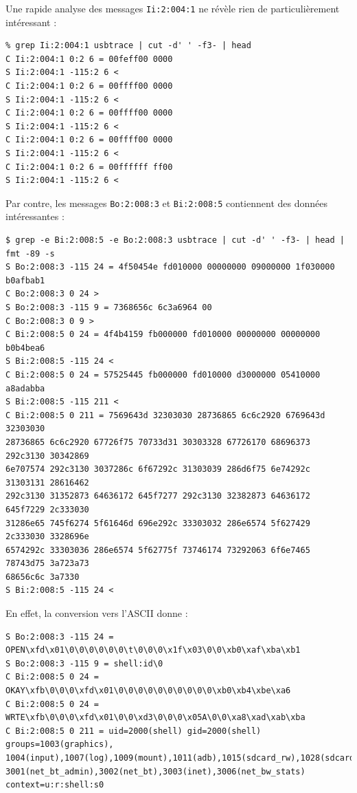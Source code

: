 \documentclass[a4paper,10pt]{article}
\begin{document}
Une rapide analyse des messages \texttt{Ii:2:004:1} ne révèle rien de particulièrement intéressant :
\begin{verbatim}
% grep Ii:2:004:1 usbtrace | cut -d' ' -f3- | head
C Ii:2:004:1 0:2 6 = 00feff00 0000
S Ii:2:004:1 -115:2 6 <
C Ii:2:004:1 0:2 6 = 00ffff00 0000
S Ii:2:004:1 -115:2 6 <
C Ii:2:004:1 0:2 6 = 00ffff00 0000
S Ii:2:004:1 -115:2 6 <
C Ii:2:004:1 0:2 6 = 00ffff00 0000
S Ii:2:004:1 -115:2 6 <
C Ii:2:004:1 0:2 6 = 00ffffff ff00
S Ii:2:004:1 -115:2 6 <
\end{verbatim}

Par contre, les messages \texttt{Bo:2:008:3} et \texttt{Bi:2:008:5} contiennent des données intéressantes :
\begin{verbatim}
$ grep -e Bi:2:008:5 -e Bo:2:008:3 usbtrace | cut -d' ' -f3- | head | fmt -89 -s
S Bo:2:008:3 -115 24 = 4f50454e fd010000 00000000 09000000 1f030000 b0afbab1
C Bo:2:008:3 0 24 >
S Bo:2:008:3 -115 9 = 7368656c 6c3a6964 00
C Bo:2:008:3 0 9 >
C Bi:2:008:5 0 24 = 4f4b4159 fb000000 fd010000 00000000 00000000 b0b4bea6
S Bi:2:008:5 -115 24 <
C Bi:2:008:5 0 24 = 57525445 fb000000 fd010000 d3000000 05410000 a8adabba
S Bi:2:008:5 -115 211 <
C Bi:2:008:5 0 211 = 7569643d 32303030 28736865 6c6c2920 6769643d 32303030
28736865 6c6c2920 67726f75 70733d31 30303328 67726170 68696373 292c3130 30342869
6e707574 292c3130 3037286c 6f67292c 31303039 286d6f75 6e74292c 31303131 28616462
292c3130 31352873 64636172 645f7277 292c3130 32382873 64636172 645f7229 2c333030
31286e65 745f6274 5f61646d 696e292c 33303032 286e6574 5f627429 2c333030 3328696e
6574292c 33303036 286e6574 5f62775f 73746174 73292063 6f6e7465 78743d75 3a723a73
68656c6c 3a7330
S Bi:2:008:5 -115 24 <
\end{verbatim}

En effet, la conversion vers l'ASCII donne :
\begin{verbatim}
S Bo:2:008:3 -115 24 = OPEN\xfd\x01\0\0\0\0\0\0\t\0\0\0\x1f\x03\0\0\xb0\xaf\xba\xb1
S Bo:2:008:3 -115 9 = shell:id\0
C Bi:2:008:5 0 24 = OKAY\xfb\0\0\0\xfd\x01\0\0\0\0\0\0\0\0\0\0\xb0\xb4\xbe\xa6
C Bi:2:008:5 0 24 = WRTE\xfb\0\0\0\xfd\x01\0\0\xd3\0\0\0\x05A\0\0\xa8\xad\xab\xba
C Bi:2:008:5 0 211 = uid=2000(shell) gid=2000(shell) groups=1003(graphics),
1004(input),1007(log),1009(mount),1011(adb),1015(sdcard_rw),1028(sdcard_r),
3001(net_bt_admin),3002(net_bt),3003(inet),3006(net_bw_stats) context=u:r:shell:s0
\end{verbatim}
\end{document}
